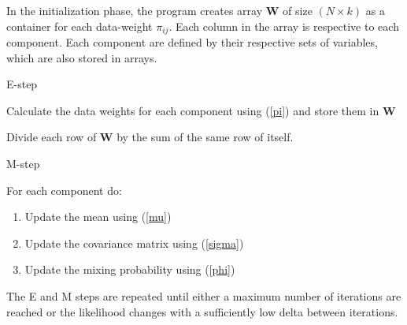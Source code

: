 \documentclass[12pt]{article}
\begin{document}
        In the initialization phase, the program creates array \textbf W of size $(N \times k)$ as a container for each data-weight $\pi_{ij}$. Each column in the array is respective to each component. Each component are defined by their respective sets of variables, which are also stored in arrays. 

        \begin{titleenum}{E-step}
            \item Calculate the data weights for each component using (\ref{pi}) and store them in \textbf W
            \item Divide each row of \textbf W by the sum of the same row of itself. 
        \end{titleenum}
        

        \begin{titleenum}{M-step}
            \item For each component do:
            \begin{enumerate}
                \item Update the mean using (\ref{mu})
                \item Update the covariance matrix using (\ref{sigma}) 
                \item Update the mixing probability using (\ref{phi})
            \end{enumerate}
        \end{titleenum}

    The E and M steps are repeated until either a maximum number of iterations are reached or the likelihood  changes with a sufficiently low delta between iterations.
\end{document}
